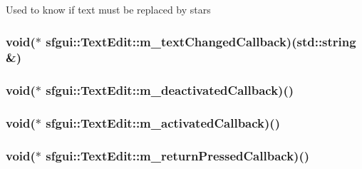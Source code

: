 Used to know if text must be replaced by stars \hypertarget{classsfgui_1_1TextEdit_a6d415ef1daf7f9fdf0dec3d71cb8eab}{
\subsubsection[m\_\-textChangedCallback]{\setlength{\rightskip}{0pt plus 5cm}void($\ast$ {\bf sfgui::TextEdit::m\_\-textChangedCallback})(std::string \&)}}
\label{classsfgui_1_1TextEdit_a6d415ef1daf7f9fdf0dec3d71cb8eab}


\hypertarget{classsfgui_1_1TextEdit_bfa97d7c95f54cc91600375242fe1ea6}{
\subsubsection[m\_\-deactivatedCallback]{\setlength{\rightskip}{0pt plus 5cm}void($\ast$ {\bf sfgui::TextEdit::m\_\-deactivatedCallback})()}}
\label{classsfgui_1_1TextEdit_bfa97d7c95f54cc91600375242fe1ea6}


\hypertarget{classsfgui_1_1TextEdit_9cf910f9fca635f595d6a8963d7e30d1}{
\subsubsection[m\_\-activatedCallback]{\setlength{\rightskip}{0pt plus 5cm}void($\ast$ {\bf sfgui::TextEdit::m\_\-activatedCallback})()}}
\label{classsfgui_1_1TextEdit_9cf910f9fca635f595d6a8963d7e30d1}


\hypertarget{classsfgui_1_1TextEdit_d86f9eaadf1313214631b2de009abf55}{
\subsubsection[m\_\-returnPressedCallback]{\setlength{\rightskip}{0pt plus 5cm}void($\ast$ {\bf sfgui::TextEdit::m\_\-returnPressedCallback})()}}
\label{classsfgui_1_1TextEdit_d86f9eaadf1313214631b2de009abf55}


